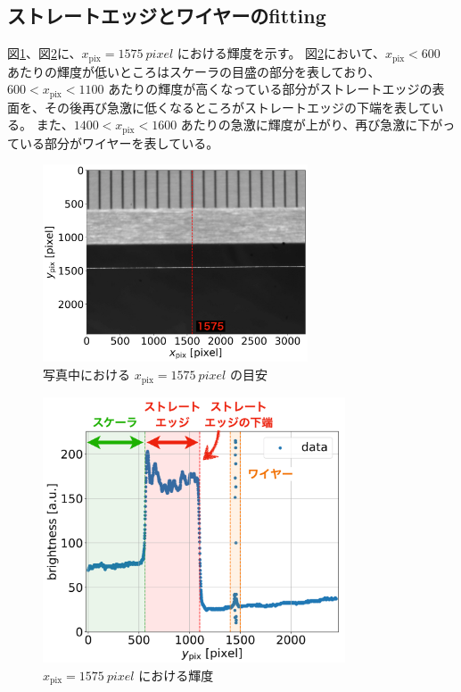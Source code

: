 \documentclass[../../main.tex]{subfiles}
\begin{document}
\subsection{ストレートエッジとワイヤーのfitting}
図\ref{fig:wiresag_edge_target}、図\ref{fig:wiresag_edge_brightness}に、$x_{\mathrm{pix}}=\SI{1575}{pixel}$ における輝度を示す。
図\ref{fig:wiresag_edge_brightness}において、$x_{\mathrm{pix}}<600$ あたりの輝度が低いところはスケーラの目盛の部分を表しており、
$600 < x_{\mathrm{pix}} < 1100$ あたりの輝度が高くなっている部分がストレートエッジの表面を、その後再び急激に低くなるところがストレートエッジの下端を表している。
また、$1400 < x_{\mathrm{pix}} < 1600$ あたりの急激に輝度が上がり、再び急激に下がっている部分がワイヤーを表している。
\begin{figure}[H]
    \centering
    \includegraphics[width=0.7\textwidth]{wiresag/wiresag_edge_target.pdf}
    \caption{写真中における $x_{\mathrm{pix}}=\SI{1575}{pixel}$ の目安}
    \label{fig:wiresag_edge_target}
\end{figure}
\begin{figure}[H]
    \centering
    \includegraphics[width=0.8\textwidth]{wiresag/wiresag_edge_brightness.pdf}
    \caption{$x_{\mathrm{pix}}=\SI{1575}{pixel}$ における輝度}
    \label{fig:wiresag_edge_brightness}
\end{figure}
\end{document}
